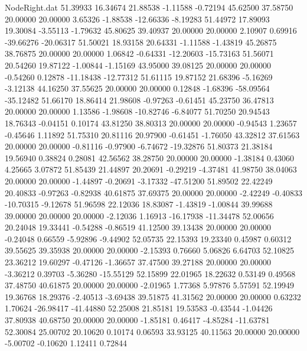 \begin{filecontents}{NodeRight.dat}
  51.39933   16.34674   21.88538    -1.11588   -0.72194   45.62500   37.58750   20.00000   20.00000    3.65326   -1.88538  -12.66336   -8.19283
  51.44972   17.89093   19.30084    -3.55113   -1.79632   45.80625   39.40937   20.00000   20.00000    2.10907    0.69916  -39.66276  -20.06317
  51.50021   18.93158   20.64331    -1.11588   -1.43819   45.26875   38.76875   20.00000   20.00000    1.06842   -0.64331  -12.20603  -15.73163
  51.56071   20.54260   19.87122    -1.00844   -1.15169   43.95000   39.08125   20.00000   20.00000   -0.54260    0.12878  -11.18438  -12.77312
  51.61115   19.87152   21.68396    -5.16269   -3.12138   44.16250   37.55625   20.00000   20.00000    0.12848   -1.68396  -58.09564  -35.12482
  51.66170   18.86414   21.98608    -0.97263   -0.61451   45.23750   36.47813   20.00000   20.00000    1.13586   -1.98608  -10.82746   -6.84077
  51.70250   20.94543   18.76343    -0.04151    0.10174   43.81250   38.80313   20.00000   20.00000   -0.94543    1.23657   -0.45646    1.11892
  51.75310   20.81116   20.97900    -0.61451   -1.76050   43.32812   37.61563   20.00000   20.00000   -0.81116   -0.97900   -6.74672  -19.32876
  51.80373   21.38184   19.56940     0.38824    0.28081   42.56562   38.28750   20.00000   20.00000   -1.38184    0.43060    4.25665    3.07872
  51.85439   21.44897   20.20691    -0.29219   -4.37481   41.98750   38.04063   20.00000   20.00000   -1.44897   -0.20691   -3.17332  -47.51200
  51.89502   22.42249   20.40833    -0.97263   -0.82938   40.61875   37.69375   20.00000   20.00000   -2.42249   -0.40833  -10.70315   -9.12678
  51.96598   22.12036   18.83087    -1.43819   -1.00844   39.99688   39.00000   20.00000   20.00000   -2.12036    1.16913  -16.17938  -11.34478
  52.00656   20.24048   19.33441    -0.54288   -0.86519   41.12500   39.13438   20.00000   20.00000   -0.24048    0.66559   -5.92896   -9.44902
  52.05735   22.15393   19.23340     0.45987    0.60312   39.55625   39.35938   20.00000   20.00000   -2.15393    0.76660    5.06826    6.64703
  52.10825   23.36212   19.60297    -0.47126   -1.36657   37.47500   39.27188   20.00000   20.00000   -3.36212    0.39703   -5.36280  -15.55129
  52.15899   22.01965   18.22632     0.53149    0.49568   37.48750   40.61875   20.00000   20.00000   -2.01965    1.77368    5.97876    5.57591
  52.19949   19.36768   18.29376    -2.40513   -3.69438   39.51875   41.31562   20.00000   20.00000    0.63232    1.70624  -26.98417  -41.44880
  52.25008   21.85181   19.53583    -0.43544   -1.04426   37.80938   40.68750   20.00000   20.00000   -1.85181    0.46417   -4.85284  -11.63781
  52.30084   25.00702   20.10620     0.10174    0.06593   33.93125   40.11563   20.00000   20.00000   -5.00702   -0.10620    1.12411    0.72844

\end{filecontents}
